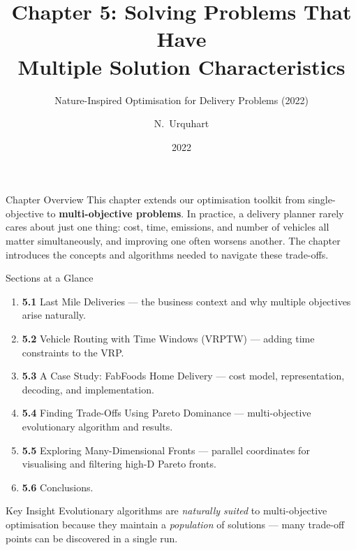 \documentclass[aspectratio=169,10pt]{beamer}
\title[Chapter 5 — Multi-Objective Delivery]{%
  Chapter 5: Solving Problems That Have\\
  Multiple Solution Characteristics}
\subtitle{Nature-Inspired Optimisation for Delivery Problems (2022)}
\author{N.~Urquhart}
\institute{Natural Computing Series, Springer}
\date{2022}
\begin{document}

\begin{frame}
  \titlepage
\end{frame}

\begin{frame}{Chapter Overview}
  This chapter extends our optimisation toolkit from single-objective to
  \textbf{multi-objective problems}.  In practice, a delivery planner rarely
  cares about just one thing: cost, time, emissions, and number of vehicles all
  matter simultaneously, and improving one often worsens another.  The chapter
  introduces the concepts and algorithms needed to navigate these trade-offs.

  \begin{block}{Sections at a Glance}
    \begin{enumerate}
      \item \textbf{5.1} Last Mile Deliveries — the business context and
            why multiple objectives arise naturally.
      \item \textbf{5.2} Vehicle Routing with Time Windows (VRPTW) —
            adding time constraints to the VRP.
      \item \textbf{5.3} A Case Study: FabFoods Home Delivery — cost model,
            representation, decoding, and implementation.
      \item \textbf{5.4} Finding Trade-Offs Using Pareto Dominance —
            multi-objective evolutionary algorithm and results.
      \item \textbf{5.5} Exploring Many-Dimensional Fronts — parallel
            coordinates for visualising and filtering high-D Pareto fronts.
      \item \textbf{5.6} Conclusions.
    \end{enumerate}
  \end{block}

  \begin{alertblock}{Key Insight}
    Evolutionary algorithms are \emph{naturally suited} to multi-objective
    optimisation because they maintain a \emph{population} of solutions — many
    trade-off points can be discovered in a single run.
  \end{alertblock}
\end{frame}

\end{document}
